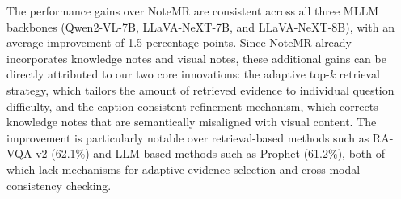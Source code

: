 \documentclass[manuscript,screen,review]{acmart}
\begin{document}
The performance gains over NoteMR are consistent across all three MLLM backbones (Qwen2-VL-7B, LLaVA-NeXT-7B, and LLaVA-NeXT-8B), with an average improvement of 1.5 percentage points. Since NoteMR already incorporates knowledge notes and visual notes, these additional gains can be directly attributed to our two core innovations: the adaptive top-$k$ retrieval strategy, which tailors the amount of retrieved evidence to individual question difficulty, and the caption-consistent refinement mechanism, which corrects knowledge notes that are semantically misaligned with visual content. The improvement is particularly notable over retrieval-based methods such as RA-VQA-v2 (62.1\%) and LLM-based methods such as Prophet (61.2\%), both of which lack mechanisms for adaptive evidence selection and cross-modal consistency checking.
\end{document}
